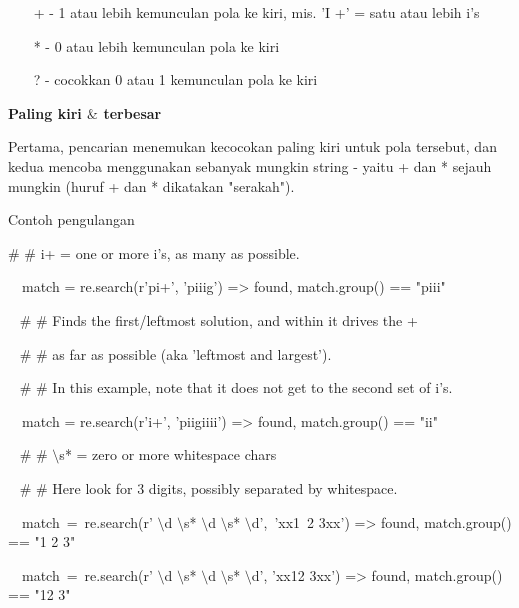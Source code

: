\vspace{12pt}
\noindent 
~~~ + - 1 atau lebih kemunculan pola ke kiri, mis. 'I +' = satu atau lebih i's \par
\noindent 
~~~ * - 0 atau lebih kemunculan pola ke kiri \par
\noindent 
~~~ ? - cocokkan 0 atau 1 kemunculan pola ke kiri \par
\vspace{12pt}
\vspace{14pt}
\noindent 
{\fontsize{14pt}{14pt}\selectfont \textbf{Paling kiri  $  \&  $ terbesar} \\} \par
Pertama, pencarian menemukan kecocokan paling kiri untuk pola tersebut, dan kedua mencoba menggunakan sebanyak mungkin string - yaitu + dan * sejauh mungkin (huruf + dan * dikatakan "serakah"). \par
\noindent 
Contoh pengulangan \par
\vspace{12pt}
\noindent 
 $  \#  $ $  \#  $ i+ = one or more i's, as many as possible. \par
\noindent 
~~match = re.search(r'pi+', 'piiig') =>  found, match.group() == "piii" \par
\vspace{12pt}
\noindent 
~  $  \#  $ $  \#  $ Finds the first/leftmost solution, and within it drives the + \par
\noindent 
~  $  \#  $ $  \#  $ as far as possible (aka 'leftmost and largest'). \par
\noindent 
~  $  \#  $ $  \#  $ In this example, note that it does not get to the second set of i's. \par
\noindent 
~~match = re.search(r'i+', 'piigiiii') =>  found, match.group() == "ii" \par
\vspace{12pt}
\noindent 
~  $  \#  $ $  \#  $  $  \setminus  $s* = zero or more whitespace chars \par
\noindent 
~  $  \#  $ $  \#  $ Here look for 3 digits, possibly separated by whitespace. \par
\noindent 
~~match~=~re.search(r' $  \setminus  $d $  \setminus  $s* $  \setminus  $d $  \setminus  $s* $  \setminus  $d',~'xx1~2   3xx') =>  found, match.group() == "1 2   3" \par
\noindent 
~~match~=~re.search(r' $  \setminus  $d $  \setminus  $s* $  \setminus  $d $  \setminus  $s* $  \setminus  $d', 'xx12  3xx') =>  found, match.group() == "12  3" \par

